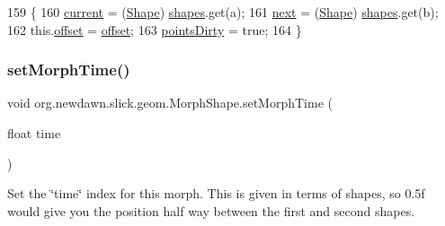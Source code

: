 \begin{DoxyCode}
159                                                       \{
160         \mbox{\hyperlink{classorg_1_1newdawn_1_1slick_1_1geom_1_1_morph_shape_adc35bd32e88974946c096e273b648575}{current}} = (\mbox{\hyperlink{classorg_1_1newdawn_1_1slick_1_1geom_1_1_shape_ab4721f44d2bdecd9d65a56181589b4b1}{Shape}}) \mbox{\hyperlink{classorg_1_1newdawn_1_1slick_1_1geom_1_1_morph_shape_a24eb760097e650b268700165c0cd66f2}{shapes}}.get(a);
161         \mbox{\hyperlink{classorg_1_1newdawn_1_1slick_1_1geom_1_1_morph_shape_a5ce48bb978769ccae833b7c9f2a7df27}{next}} = (\mbox{\hyperlink{classorg_1_1newdawn_1_1slick_1_1geom_1_1_shape_ab4721f44d2bdecd9d65a56181589b4b1}{Shape}}) \mbox{\hyperlink{classorg_1_1newdawn_1_1slick_1_1geom_1_1_morph_shape_a24eb760097e650b268700165c0cd66f2}{shapes}}.get(b);
162         this.\mbox{\hyperlink{classorg_1_1newdawn_1_1slick_1_1geom_1_1_morph_shape_a006e01581d798601f1aaf5bea5dc1583}{offset}} = \mbox{\hyperlink{classorg_1_1newdawn_1_1slick_1_1geom_1_1_morph_shape_a006e01581d798601f1aaf5bea5dc1583}{offset}};
163         \mbox{\hyperlink{classorg_1_1newdawn_1_1slick_1_1geom_1_1_shape_a61fe1954d2fdefc72c34b284f4fcfdb4}{pointsDirty}} = \textcolor{keyword}{true};
164     \}
\end{DoxyCode}
\mbox{\label{classorg_1_1newdawn_1_1slick_1_1geom_1_1_morph_shape_add1fba81944fe0dfd474ae7f5f808f64}} 
\subsubsection{\texorpdfstring{set\+Morph\+Time()}{setMorphTime()}}
{\footnotesize\ttfamily void org.\+newdawn.\+slick.\+geom.\+Morph\+Shape.\+set\+Morph\+Time (\begin{DoxyParamCaption}\item[{float}]{time }\end{DoxyParamCaption})\hspace{0.3cm}{\ttfamily [inline]}}

Set the \char`\"{}time\char`\"{} index for this morph. This is given in terms of shapes, so 0.\+5f would give you the position half way between the first and second shapes.


